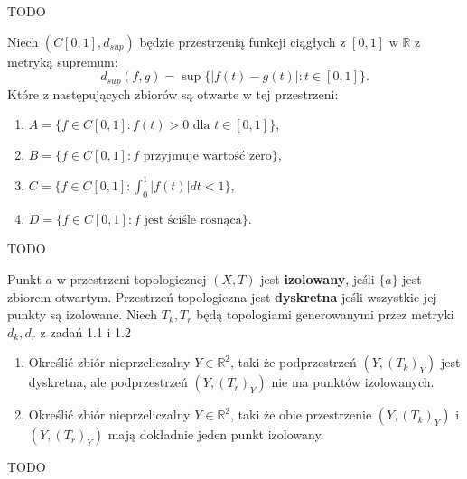 \begin{solution}
	TODO
\end{solution} 
\begin{problem}[1.6]
	Niech $\left( C\left[ 0,1 \right], d_{sup} \right) $ będzie przestrzenią funkcji ciągłych z $[0,1]$ w $\mathbb{R}$ z metryką supremum:
	\[
		d_{sup}\left( f,g \right) = \sup \{\left| f\left( t \right) - g\left( t \right)  \right| : t \in [0,1]\} 
	.\] 
	Które z następujących zbiorów są otwarte w tej przestrzeni:
	\begin{enumerate}[label=\alph*)]
		\item $A = \{f \in C\left[ 0,1 \right] : f\left( t \right) > 0 \text{ dla } t \in \left[ 0,1 \right] \} $,
		\item $B = \{f \in C\left[ 0,1 \right] : f \text{ przyjmuje wartość zero}\} $,
		\item $C = \{f \in C\left[ 0,1 \right] : \int_{0}^{1}\left| f\left( t \right)  \right| dt < 1\} $,
		\item $D = \{f \in C\left[ 0,1 \right] : f \text{ jest ściśle rosnąca}\} $.
	\end{enumerate}
\end{problem} 
\begin{solution}
	TODO
\end{solution} 	
\begin{problem}[1.11]
Punkt $a$ w przestrzeni topologicznej $\left( X,T \right) $ jest \textbf{izolowany}, jeśli $\{a\} $ jest zbiorem otwartym. Przestrzeń topologiczna jest \textbf{dyskretna} jeśli wszystkie jej punkty są izolowane. Niech $T_{k}, T_{r}$ będą topologiami generowanymi przez metryki $d_{k}, d_{r}$ z zadań 1.1 i 1.2
\begin{enumerate}[label=\alph*)]
	\item Określić zbiór nieprzeliczalny $Y \in \mathbb{R}^2$, taki że podprzestrzeń $\left( Y, \left( T_{k} \right)_{Y} \right) $ jest dyskretna, ale podprzestrzeń $\left( Y, \left( T_{r} \right)_{Y} \right) $ nie ma punktów izolowanych.
	\item Określić zbiór nieprzeliczalny $Y \in \mathbb{R}^2$, taki że obie przestrzenie $\left( Y, \left( T_{k} \right) _{Y} \right) $ i $\left( Y, \left( T_{r} \right) _{Y} \right) $ mają dokładnie jeden punkt izolowany.
\end{enumerate}
\end{problem} 	
\begin{solution}
	TODO
\end{solution} 
